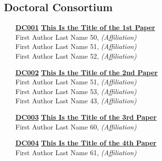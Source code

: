 \subsection{Doctoral Consortium}
\begin{enumerate}
\item[\href{https://doi.org/10.1145/1122445.1122456}{\textbf{DC001}}]
\href{https://doi.org/10.1145/1122445.1122456}{\textbf{This Is the Title of the 1st Paper}}\\
First Author Last Name 50, \emph{(Affiliation)}\\
First Author Last Name 51, \emph{(Affiliation)}\\
First Author Last Name 52, \emph{(Affiliation)}\\

\item[\href{https://doi.org/10.1145/1122445.1122456}{\textbf{DC002}}]
\href{https://doi.org/10.1145/1122445.1122456}{\textbf{This Is the Title of the 2nd Paper}}\\
First Author Last Name 51, \emph{(Affiliation)}\\
First Author Last Name 53, \emph{(Affiliation)}\\
First Author Last Name 43, \emph{(Affiliation)}\\

\item[\href{https://doi.org/10.1145/1122445.1122456}{\textbf{DC003}}]
\href{https://doi.org/10.1145/1122445.1122456}{\textbf{This Is the Title of the 3rd Paper}}\\
First Author Last Name 60, \emph{(Affiliation)}\\

\item[\href{https://doi.org/10.1145/1122445.1122456}{\textbf{DC004}}]
\href{https://doi.org/10.1145/1122445.1122456}{\textbf{This Is the Title of the 4th Paper}}\\
First Author Last Name 61, \emph{(Affiliation)}\\
\end{enumerate}


